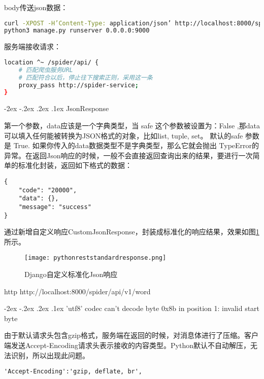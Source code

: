 \documentclass[8pt]{book}
\makeatletter
\numberwithin{dummy}{section}
\theoremstyle{ocrenumbox}
\theoremstyle{blacknumex}
\theoremstyle{blacknumbox}
\theoremstyle{ocrenum}
\renewcommand\paragraph{\@startsection{paragraph}{4}{\z@}
	{-2ex \@plus-.2ex \@minus .2ex}
	{.1ex}
	{\normalfont\small\sffamily\bfseries}}
\newlength\esp
\makeatother
\begin{document}
body传送json数据：

\begin{lstlisting}[language=Bash]
curl -XPOST -H’Content-Type: application/json’ http://localhost:8000/spider/api/book -d@temp.json
python3 manage.py runserver 0.0.0.0:9000
\end{lstlisting}

服务端接收请求：

\begin{lstlisting}[language=Bash]
location ^~ /spider/api/ {
	# 匹配爬虫服务URL
	# 匹配符合以后，停止往下搜索正则，采用这一条
	proxy_pass http://spider-service;
}
\end{lstlisting}

\paragraph{JsonResponse}

第一个参数，data应该是一个字典类型，当 safe 这个参数被设置为：False ,那data可以填入任何能被转换为JSON格式的对象，比如list, tuple, set。 默认的safe 参数是 True. 如果你传入的data数据类型不是字典类型，那么它就会抛出 TypeError的异常。在返回Json响应的时候，一般不会直接返回查询出来的结果，要进行一次简单的标准化封装，返回如下格式的数据：

\begin{lstlisting}
{
    "code": "20000",
    "data": {},
    "message": "success"
}
\end{lstlisting}

通过新增自定义响应CustomJsonResponse，封装成标准化的响应结果，效果如图\ref{fig:pythonreststandardresponse}所示。

\begin{figure}[htbp]
	\centering
	\texttt{[image: pythonreststandardresponse.png]}
	\caption{Django自定义标准化Json响应}
	\label{fig:pythonreststandardresponse}
\end{figure}


http http://localhost:8000/spider/api/v1/word

\paragraph{'utf8' codec can't decode byte 0x8b in position 1: invalid start byte}

由于默认请求头包含gzip格式，服务端在返回的时候，对消息体进行了压缩。客户端发送Accept-Encoding请求头表示接收的内容类型。Python默认不自动解压，无法识别，所以出现此问题。

\begin{lstlisting}
'Accept-Encoding':'gzip, deflate, br',
\end{lstlisting}
\end{document}
